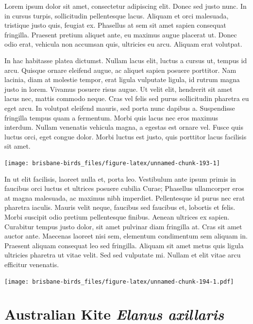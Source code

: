 \documentclass[]{book}
\let\origfigure\figure
\let\endorigfigure\endfigure
\renewenvironment{figure}[1][2] {
  \expandafter\origfigure\expandafter[H]
} {
  \endorigfigure
}
\begin{document}
Lorem ipsum dolor sit amet, consectetur adipiscing elit. Donec sed justo
nunc. In in cursus turpis, sollicitudin pellentesque lacus. Aliquam et
orci malesuada, tristique justo quis, feugiat ex. Phasellus at sem sit
amet sapien consequat fringilla. Praesent pretium aliquet ante, eu
maximus augue placerat ut. Donec odio erat, vehicula non accumsan quis,
ultricies eu arcu. Aliquam erat volutpat.

In hac habitasse platea dictumst. Nullam lacus elit, luctus a cursus ut,
tempus id arcu. Quisque ornare eleifend augue, ac aliquet sapien posuere
porttitor. Nam lacinia, diam at molestie tempor, erat ligula vulputate
ligula, id rutrum magna justo in lorem. Vivamus posuere risus augue. Ut
velit elit, hendrerit sit amet lacus nec, mattis commodo neque. Cras vel
felis sed purus sollicitudin pharetra eu eget arcu. In volutpat eleifend
mauris, sed porta nunc dapibus a. Suspendisse fringilla tempus quam a
fermentum. Morbi quis lacus nec eros maximus interdum. Nullam venenatis
vehicula magna, a egestas est ornare vel. Fusce quis luctus orci, eget
congue dolor. Morbi luctus est justo, quis porttitor lacus facilisis sit
amet.

\begin{figure}
\texttt{[image: brisbane-birds\_files/figure-latex/unnamed-chunk-193-1]} \caption{insert figure caption}\label{fig:unnamed-chunk-193}
\end{figure}

In ut elit facilisis, laoreet nulla et, porta leo. Vestibulum ante ipsum
primis in faucibus orci luctus et ultrices posuere cubilia Curae;
Phasellus ullamcorper eros at magna malesuada, ac maximus nibh
imperdiet. Pellentesque id purus nec erat pharetra iaculis. Mauris velit
neque, faucibus sed faucibus et, lobortis et felis. Morbi suscipit odio
pretium pellentesque finibus. Aenean ultrices ex sapien. Curabitur
tempus justo dolor, sit amet pulvinar diam fringilla at. Cras sit amet
auctor ante. Maecenas laoreet nisi sem, elementum condimentum sem
aliquam in. Praesent aliquam consequat leo sed fringilla. Aliquam sit
amet metus quis ligula ultricies pharetra ut vitae velit. Sed sed
vulputate mi. Nullam et elit vitae arcu efficitur venenatis.

\begin{figure}
\centering
\texttt{[image: brisbane-birds\_files/figure-latex/unnamed-chunk-194-1.pdf]}
\caption{\label{fig:unnamed-chunk-194}insert figure caption}
\end{figure}

\section{\texorpdfstring{Australian Kite \emph{Elanus
axillaris}}{Australian Kite Elanus axillaris}}\label{australian-kite-elanus-axillaris}
\end{document}
